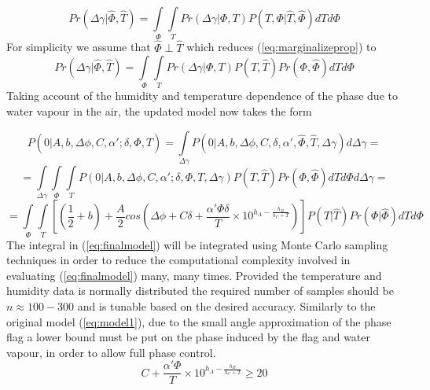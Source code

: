 \begin{equation}
Pr(\Delta\gamma|\hat{\Phi},\hat{T})= \int \limits_\Phi \int \limits_T Pr(\Delta\gamma|\Phi,T)P(T,\Phi|\hat{T},\hat{\Phi})dTd\Phi
\label{eq:marginalizeprop}
\end{equation}  
For simplicity we assume that $\hat{\Phi}\perp\hat{T}$ which reduces 
(\ref{eq:marginalizeprop}) to 
\begin{equation}
Pr(\Delta\gamma|\hat{\Phi},\hat{T})= \int \limits_\Phi \int \limits_T Pr(\Delta\gamma|\Phi,T)P(T,\hat{T})Pr(\Phi,\hat{\Phi})dTd\Phi
\label{eq:marginalizeprop2}
\end{equation}
Taking account of the humidity and temperature dependence of the phase due to water vapour in the air, the updated model now takes the form 

\begin{equation*}
  P(0|A,b,\Delta\phi,C,\alpha';\delta,\hat{\Phi},\hat{T}) = \int \limits_{\Delta\gamma} P(0|A,b,\Delta\phi,C,\delta,\alpha',\hat{\Phi},\hat{T},\Delta\gamma)d\Delta\gamma =
\end{equation*}
\begin{equation*}
= \int \limits_{\Delta\gamma} \int \limits_\Phi \int \limits_T P(0|A,b,\Delta\phi,C,\alpha';\delta,\Phi,T,\Delta\gamma)P(T,\hat{T})Pr(\Phi,\hat{\Phi})dTd\Phi d\Delta\gamma =
\end{equation*}
\small
\begin{equation}
= \int \limits_\Phi \int \limits_T \left[(\frac{1}{2}+b)+\frac{A}{2}cos\left(\Delta\phi + C\delta + \frac{\alpha' \Phi\delta}{T}\times 10^{h_A - \frac{h_B}{h_C + T}}\right)\right]P(T|\hat{T})Pr(\Phi|\hat{\Phi})dTd\Phi
\label{eq:finalmodel}
\end{equation}
\normalsize
The integral in (\ref{eq:finalmodel}) will be integrated using Monte Carlo sampling techniques in order to reduce the computational complexity involved in evaluating (\ref{eq:finalmodel}) many, many times. Provided the temperature and humidity data is normally distributed the required number of samples should be $n\approx100-300$ and is tunable based on the desired accuracy. Similarly to the original model (\ref{eq:model1}), due to the small angle approximation of the phase flag a lower bound must be put on the phase induced by the flag and water vapour, in order to allow full phase control. 
\begin{equation}
C+\frac{\alpha'\Phi}{T}\times 10^{h_A - \frac{h_B}{h_C + T}} \geq 20
\label{eq:fullphasecontrol}
\end{equation}

